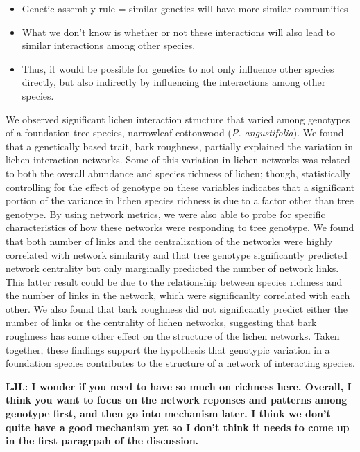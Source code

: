 \documentclass[11pt,twocolumn,twoside,lineno]{pnas-new}
\begin{document}
\begin{itemize}
\item Genetic assembly rule = similar genetics will have more similar
  communities
\item What we don't know is whether or not these interactions will
  also lead to similar interactions among other species.
\item Thus, it would be possible for genetics to not only influence
  other species directly, but also indirectly by influencing the
  interactions among other species.
\end{itemize}

We observed significant lichen interaction structure that varied among
genotypes of a foundation tree species, narrowleaf cottonwood
(\textit{P. angustifolia}). We found that a genetically based trait,
bark roughness, partially explained the variation in lichen
interaction networks. Some of this variation in lichen networks was
related to both the overall abundance and species richness of lichen;
though, statistically controlling for the effect of genotype on these
variables indicates that a significant portion of the variance in
lichen species richness is due to a factor other than tree
genotype. By using network metrics, we were also able to probe for
specific characteristics of how these networks were responding to tree
genotype. We found that both number of links and the centralization of
the networks were highly correlated with network similarity and that
tree genotype significantly predicted network centrality but only
marginally predicted the number of network links. This latter result
could be due to the relationship between species richness and the
number of links in the network, which were significanlty correlated
with each other. We also found that bark roughness did not
significantly predict either the number of links or the centrality of
lichen networks, suggesting that bark roughness has some other effect
on the structure of the lichen networks. Taken together, these
findings support the hypothesis that genotypic variation in a
foundation species contributes to the structure of a network of
interacting species.

\textbf{LJL: I wonder if you need to have so much on richness here. 
Overall, I think you want to focus on the network reponses and
patterns among genotype first, and then go into mechanism later. I
think we don’t quite have a good mechanism yet so I don’t think it
needs to come up in the first paragrpah of the discussion.}
\end{document}
